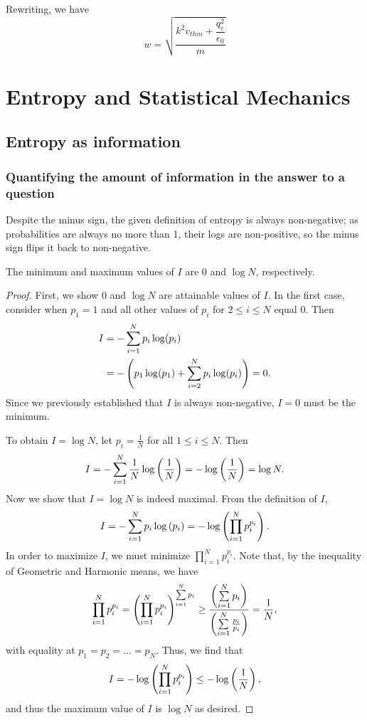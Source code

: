 \documentclass{paper}
\begin{document}
    Rewriting, we have
    \[w = \sqrt{\dfrac{k^2v_{thm} + \dfrac{q_e^2}{\epsilon_0}}{m}}\]
    

\chapter{Entropy and Statistical Mechanics}
\section{Entropy as information}
\subsection{Quantifying the amount of information in the answer to a question}

\par Despite the minus sign, the given definition of entropy is always non-negative; as probabilities are always no more than 1, their logs are non-positive, so the minus sign flips it back to non-negative.

\begin{claim}
    The minimum and maximum values of $I$ are $0$ and $\log N$, respectively.
\end{claim}
    
\begin{proof}
    First, we show $0$ and $\log N$ are attainable values of $I$. In the first case, consider when $p_1=1$ and all other values of $p_i$ for $2\leq i \leq N$ equal $0$. Then
        \begin{align*}
            I
            &= -\sum\limits_{i=1}^{N} p_i\log(p_i)\\
            &= -\left( p_1\log(p_1) + \sum\limits_{i=2}^{N} p_i\log(p_i) \right) 
            = 0.
        \end{align*}
    Since we previously established that $I$ is always non-negative, $I=0$ must be the minimum.
    
    To obtain $I=\log N$, let $p_i=\frac{1}{N}$ for all $1\leq i\leq N$. Then 
        \[
            I
            = -\sum\limits_{i=1}^{N} \frac{1}{N}\log\left(\frac{1}{N}\right)
            = -\log\left(\frac{1}{N}\right) = \log N.
        \]
    Now we show that $I=\log N$ is indeed maximal. From the definition of $I$,
        \[
            I
            = -\sum\limits_{i=1}^{N} p_i\log\left( p_i \right)
            = -\log\left( \prod\limits_{i=1}^{N} p_i^{p_i} \right).
        \]
    In order to maximize $I$, we must minimize $\prod\limits_{i=1}^{N} p_i^{p_i}$. Note that, by the inequality of Geometric and Harmonic means, we have
        \[
            \prod\limits_{i=1}^{N}p_i^{p_i} 
            = \left( \prod\limits_{i=1}^{N}p_i^{p_i} \right)^{\sum\limits_{i=1}^{N} p_i}
            \geq \frac{\left(\sum\limits_{i=1}^{N} p_i\right)}{\left(\sum\limits_{i=1}^{N} \frac{p_i}{p_i}\right)}
            = \frac{1}{N},
        \]
    with equality at $p_1=p_2=\ldots=p_N$. Thus, we find that
        \[
            I
            = -\log\left( \prod\limits_{i=1}^{N} p_i^{p_i}\right) \leq -\log\left(\frac{1}{N}\right),
        \]
    and thus the maximum value of $I$ is $\log N$ as desired.
\end{proof}
\end{document}
